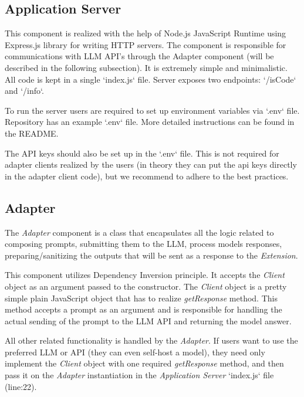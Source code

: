 \subsection{Application Server}

This component is realized with the help of Node.js \autocite{NODE} JavaScript
Runtime using Express.js library for writing HTTP servers. The component is
responsible for communications with LLM API's through the Adapter component (will
be described in the following subsection). It is extremely simple and minimalistic.
All code is kept in a single `index.js` file. Server exposes two endpoints: `/isCode`
and `/info`.

To run the server users are required to set up environment variables via `.env` file.
Repository has an example `.env` file. More detailed instructions can be found in the
README.

The API keys should also be set up in the `.env` file. This is not required for
adapter clients realized by the users (in theory they can put the api keys directly
in the adapter client code), but we recommend to adhere to the best practices.

\subsection{Adapter}

The \emph{Adapter} component is a class that encapsulates all the logic related to
composing prompts, submitting them to the LLM, process models responses,
preparing/sanitizing the outputs that will be sent as a response to the
\emph{Extension}.

This component utilizes Dependency Inversion principle. It accepts the \emph{Client}
object as an argument passed to the constructor. The \emph{Client} object is
a pretty simple plain JavaScript object that has to realize \emph{getResponse}
method. This method accepts a prompt as an argument and is responsible for handling
the actual sending of the prompt to the LLM API and returning the model answer.

All other related functionality is handled by the \emph{Adapter}. If users want to
use the preferred LLM or API (they can even self-host a model), they need only
implement the \emph{Client} object with one required \emph{getResponse} method, and
then pass it on the \emph{Adapter} instantiation in the \emph{Application Server}
`index.js` file (line:22).
